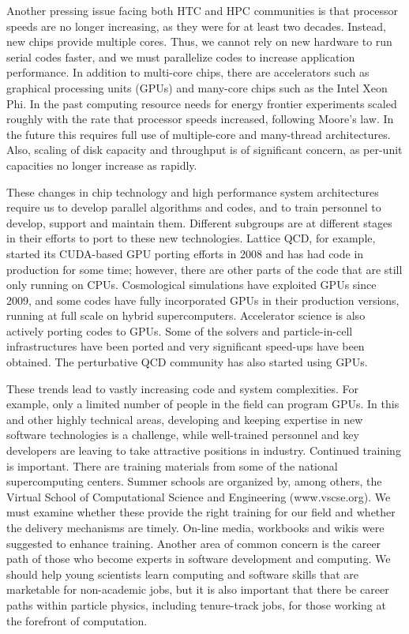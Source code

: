 Another pressing issue facing both HTC and HPC communities is that
processor speeds are no longer increasing, as they were for
at least two decades. Instead, new chips provide multiple
cores. Thus, we cannot rely on new hardware to run serial codes faster, and
we must parallelize codes to increase application performance. In addition
to multi-core chips, there are accelerators such as graphical processing
units (GPUs) and many-core chips such as the Intel Xeon Phi. 
In the past computing resource needs for energy frontier experiments scaled
roughly with the rate that processor speeds increased, following Moore's
law. In the future this requires full use of multiple-core and many-thread 
architectures. Also,
scaling of disk capacity and throughput is of
significant concern, as per-unit capacities no longer increase as rapidly.

These changes in chip technology and high performance system architectures
require us to develop parallel algorithms and codes, and to train personnel
to develop, support and maintain them. Different subgroups are at different
stages in their efforts to port to these new technologies. Lattice QCD, for
example, started its CUDA-based GPU porting efforts in 2008 and has had code in
production for some time; however, there
are other parts of the code that are still only running on CPUs.
Cosmological simulations have exploited GPUs since 2009, and some 
codes have fully incorporated GPUs in their production versions, running 
at full scale on hybrid supercomputers.
Accelerator science is also actively porting codes to GPUs. Some of the
solvers and particle-in-cell infrastructures have been ported and very
significant speed-ups have been obtained. The perturbative QCD community
has also started using GPUs.

These trends lead to vastly increasing code and system complexities. For
example, only a limited number of people in the field can program GPUs. In
this and other highly technical areas, developing and keeping expertise in
new software technologies is a challenge, while well-trained personnel and
key developers are leaving to take attractive positions in industry.
Continued training is important.  There are training materials
from some of the national supercomputing centers.  Summer schools are
organized by, among others, the Virtual School of Computational Science and
Engineering (www.vscse.org). We must examine whether these provide the
right training for our field and whether the delivery mechanisms are
timely.  On-line media, workbooks and wikis were suggested to enhance
training. Another area of common concern is the career path of those who
become experts in software development and computing. We should help
young scientists learn computing and software skills that are marketable
for non-academic jobs, but it is also important that there be career paths
within particle physics, including tenure-track jobs, for those working at
the forefront of computation.

